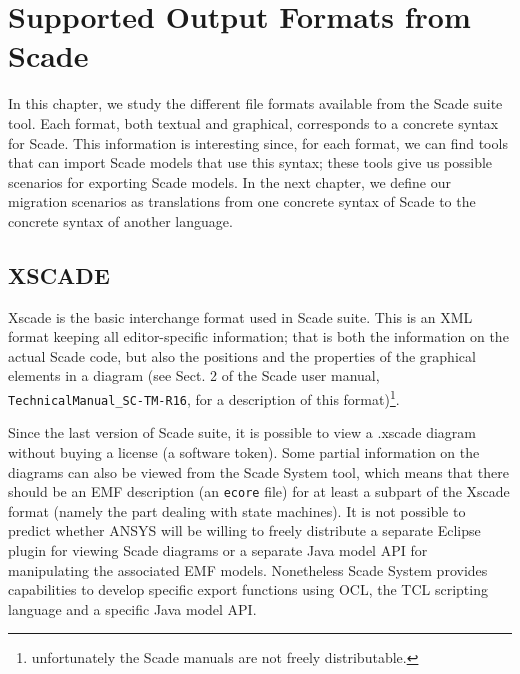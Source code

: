 \documentclass{template/openetcs_report}
\begin{document}

\chapter{Supported Output Formats from Scade}
\label{cha:supp-outp-form}

In this chapter, we study the different file formats available from
the Scade suite tool. Each format, both textual and graphical,
corresponds to a concrete syntax for Scade. This information is
interesting since, for each format, we can find tools that can import
Scade models that use this syntax; these tools give us possible
scenarios for exporting Scade models.  In the next chapter, we define
our migration scenarios as translations from one concrete syntax of
Scade to the concrete syntax of another language.


\section{XSCADE}
\label{sec:xscade}

Xscade is the basic interchange format used in Scade suite. This is an
XML format keeping all editor-specific information; that is both the
information on the actual Scade code, but also the positions and the
properties of the graphical elements in a diagram (see Sect. 2 of the
Scade user manual, \verb+TechnicalManual_SC-TM-R16+, for a description
of this format)\footnote{unfortunately the Scade manuals are not
  freely distributable.}.

Since the last version of Scade suite, it is possible to view a
.xscade diagram without buying a license (a software token). Some
partial information on the diagrams can also be viewed from the Scade
System tool, which means that there should be an EMF description (an
\verb+ecore+ file) for at least a subpart of the Xscade format (namely
the part dealing with state machines). It is not possible to predict
whether ANSYS will be willing to freely distribute a separate Eclipse
plugin for viewing Scade diagrams or a separate Java model API for
manipulating the associated EMF models. Nonetheless Scade System
provides capabilities to develop specific export functions using OCL,
the TCL scripting language and a specific Java model API.
\end{document}
